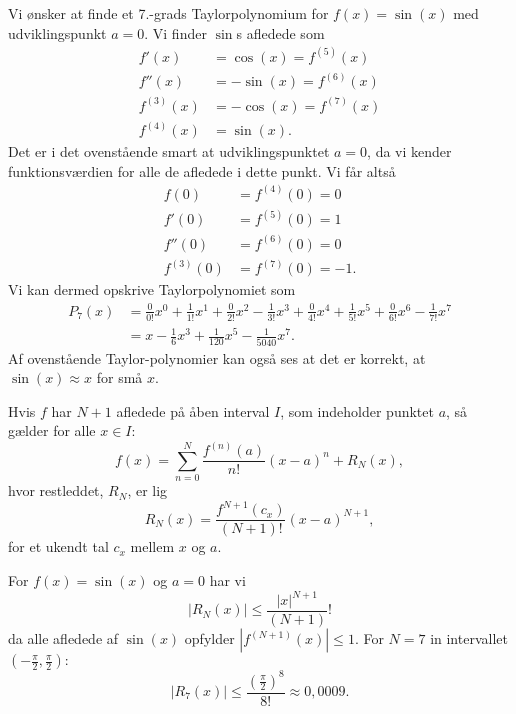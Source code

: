 \begin{eks} 
  Vi ønsker at finde et 7.-grads Taylorpolynomium for $f(x) = \sin(x)$ med udviklingspunkt $a = 0$.
  \bigbreak
  Vi finder $\sin$s afledede som
  \begin{align*}
    f'(x) &= \cos(x) = f^{(5)}(x) \\
    f''(x) &= -\sin(x) = f^{(6)}(x) \\
    f^{(3)}(x) &= -\cos(x) = f^{(7)}(x) \\
    f^{(4)}(x) &= \sin(x)
  .\end{align*}
  Det er i det ovenstående smart at udviklingspunktet $a = 0$, da vi kender funktionsværdien for alle de afledede i dette punkt. Vi får altså
  \begin{align*}
    f(0) &= f^{(4)}(0) = 0 \\
    f'(0) &= f^{(5)}(0) = 1 \\
    f''(0) &= f^{(6)}(0) = 0 \\
    f^{(3)}(0) &= f^{(7)}(0) = -1
  .\end{align*}
  Vi kan dermed opskrive Taylorpolynomiet som
  \begin{align*}
    P_7(x) &= \frac{0}{0!}x^{0} + \frac{1}{1!}x^{1} + \frac{0}{2!}x^2 - \frac{1}{3!}x^3 + \frac{0}{4!}x^{4} + \frac{1}{5!}x^{5} + \frac{0}{6!}x^{6} - \frac{1}{7!} x^{7} \\
  &= x - \frac{1}{6}x^3 + \frac{1}{120}x^5 - \frac{1}{5040}x^{7}
  .\end{align*}
  Af ovenstående Taylor-polynomier kan også ses at det er korrekt, at $\sin(x) \approx x$ for små $x$.
\end{eks}


\begin{sæt} 
  Hvis $f$ har $N + 1$ afledede på åben interval $I$, som indeholder punktet $a$, så gælder for alle $x \in I$:
  \[ 
  f(x) = \sum_{n = 0}^{N} \frac{f^{(n)}(a)}{n!}(x-a)^{n} + R_N(x)
  ,\]
  hvor restleddet, $R_N$, er lig
  \[ 
  R_N(x) = \frac{f^{N+1}(c_x)}{(N+1)!}(x-a)^{N+1}
  ,\]
  for et ukendt tal $c_x$ mellem $x$ og $a$.
\end{sæt}

\begin{eks} 
  For $f(x) = \sin(x)$ og $a = 0$ har vi
  \[ 
  |R_N(x)| \leq \frac{|x|^{N+1}}{(N+1)}!
  \]
  da alle afledede af $\sin(x)$ opfylder $\left|f^{(N+1)}(x)\right| \leq 1$. For $N = 7$ in intervallet $(-\frac{\pi}{2}, \frac{\pi}{2}):$
  \[ 
  |R_7(x)| \leq \frac{\left( \frac{\pi}{2} \right)^{8}}{8!} \approx 0,0009 
  .\]
\end{eks}


